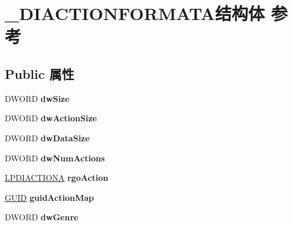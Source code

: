 \hypertarget{struct___d_i_a_c_t_i_o_n_f_o_r_m_a_t_a}{}\section{\+\_\+\+D\+I\+A\+C\+T\+I\+O\+N\+F\+O\+R\+M\+A\+T\+A结构体 参考}
\label{struct___d_i_a_c_t_i_o_n_f_o_r_m_a_t_a}
\subsection*{Public 属性}
\begin{DoxyCompactItemize}
\item 
\mbox{\label{struct___d_i_a_c_t_i_o_n_f_o_r_m_a_t_a_ae2779bfdf504052003740b8606958fd6}} 
D\+W\+O\+RD {\bfseries dw\+Size}
\item 
\mbox{\label{struct___d_i_a_c_t_i_o_n_f_o_r_m_a_t_a_a9cfe8b3be64a61e34a3c184575d71b71}} 
D\+W\+O\+RD {\bfseries dw\+Action\+Size}
\item 
\mbox{\label{struct___d_i_a_c_t_i_o_n_f_o_r_m_a_t_a_a1962f310b9593e8291074c4b9ae01e35}} 
D\+W\+O\+RD {\bfseries dw\+Data\+Size}
\item 
\mbox{\label{struct___d_i_a_c_t_i_o_n_f_o_r_m_a_t_a_a86d5b69a034c68bcc3952b6effc55351}} 
D\+W\+O\+RD {\bfseries dw\+Num\+Actions}
\item 
\mbox{\label{struct___d_i_a_c_t_i_o_n_f_o_r_m_a_t_a_a36c54b4a92f9b216b440a6f4d2f399cc}} 
\hyperlink{struct___d_i_a_c_t_i_o_n_a}{L\+P\+D\+I\+A\+C\+T\+I\+O\+NA} {\bfseries rgo\+Action}
\item 
\mbox{\label{struct___d_i_a_c_t_i_o_n_f_o_r_m_a_t_a_afb88d1f8d14c3231301cfc16dd0da97d}} 
\hyperlink{interface_g_u_i_d}{G\+U\+ID} {\bfseries guid\+Action\+Map}
\item 
\mbox{\label{struct___d_i_a_c_t_i_o_n_f_o_r_m_a_t_a_a71541d64978c30be30cfb5b33304d9a5}} 
D\+W\+O\+RD {\bfseries dw\+Genre}

\end{DoxyCompactItemize}
